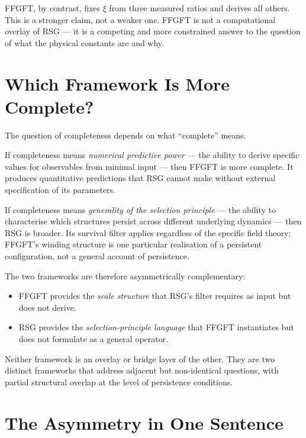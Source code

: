 FFGFT, by contrast, fixes $\xi$ from three measured ratios and derives
all others. This is a stronger claim, not a weaker one. FFGFT is not a
computational overlay of RSG — it is a competing and more constrained
answer to the question of what the physical constants are and why.

\section{Which Framework Is More Complete?}

The question of completeness depends on what ``complete'' means.

If completeness means \emph{numerical predictive power} — the ability to
derive specific values for observables from minimal input — then FFGFT is
more complete. It produces quantitative predictions that RSG cannot make
without external specification of its parameters.

If completeness means \emph{generality of the selection principle} — the
ability to characterise which structures persist across different underlying
dynamics — then RSG is broader. Its survival filter applies regardless of
the specific field theory; FFGFT's winding structure is one particular
realisation of a persistent configuration, not a general account of persistence.

The two frameworks are therefore asymmetrically complementary:

\begin{itemize}
  \item FFGFT provides the \emph{scale structure} that RSG's filter requires
        as input but does not derive.
  \item RSG provides the \emph{selection-principle language} that FFGFT
        instantiates but does not formulate as a general operator.
\end{itemize}

Neither framework is an overlay or bridge layer of the other. They are
two distinct frameworks that address adjacent but non-identical questions,
with partial structural overlap at the level of persistence conditions.

\section{The Asymmetry in One Sentence}

